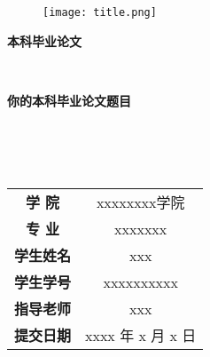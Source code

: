\thispagestyle{empty}
\begin{figure}[ht]
\centering
\texttt{[image: title.png]}
\end{figure}
\begin{center}
\textbf{本科毕业论文}
\end{center}
\nopagebreak[4]
\begin{center}
\ \\
\end{center}
\nopagebreak[4]
\begin{center}
\textbf{你的本科毕业论文题目}
\end{center}
\nopagebreak[4]
\begin{center}
\ \\\ \\\ \\
\end{center}
\nopagebreak[4]
\begin{spacing}{1.8}
\begin{center}
 \begin{tabular}{c @{ : } c }
 	\textbf{学 \quad\quad 院} & xxxxxxxx学院 \\ \cline{2-2}
 	\textbf{专 \quad\quad 业} & xxxxxxx \\ \cline{2-2}
 	\textbf{学生姓名} & xxx  \\ \cline{2-2}
 	\textbf{学生学号} & xxxxxxxxxx  \\ \cline{2-2}
 	\textbf{指导老师} & xxx	 \\ \cline{2-2}
 	\textbf{提交日期} & xxxx 年 x 月 x 日 \\ \cline{2-2}
 \end{tabular}
\end{center}
\end{spacing}
\pagebreak[4]